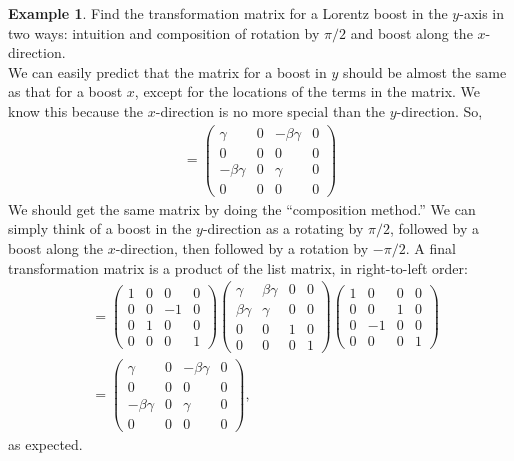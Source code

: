 \documentclass{article}
\theoremstyle{definition}
\newtheorem{exmp}{Example}[section]
\begin{document}
\begin{exmp}
	 Find the transformation matrix for a Lorentz boost in the $y$-axis in two ways: intuition and composition of rotation by $\pi/2$ and boost along the $x$-direction.\\
	 
	 We can easily predict that the matrix for a boost in $y$ should be almost the same as that for a boost $x$, except for the locations of the terms in the matrix. We know this because the $x$-direction is no more special than the $y$-direction. So,
	 \begin{align*}
	 [\Lambda^{\mu'}_\nu] = 
	 \begin{pmatrix}
	 \gamma&0&-\beta\gamma&0\\
	 0&0&0&0\\
	 -\beta\gamma&0&\gamma&0\\
	 0&0&0&0
	 \end{pmatrix}
	 \end{align*}
	 We should get the same matrix by doing the ``composition method.'' We can simply think of a boost in the $y$-direction as a rotating by $\pi/2$, followed by a boost along the $x$-direction, then followed by a rotation by $-\pi/2$. A final transformation matrix is a product of the list matrix, in right-to-left order:
	 \begin{align*}
	 [\Lambda^{\mu'}_\nu] &= 
	 \begin{pmatrix}
	 1 & 0 & 0 & 0 \\
	 0 & 0 & -1 & 0\\
	 0 & 1 & 0 & 0\\
	 0 & 0 & 0 & 1
	 \end{pmatrix}
	 \begin{pmatrix}
	 \gamma & \beta\gamma & 0 & 0\\
	 \beta\gamma & \gamma & 0 & 0\\
	 0 & 0 & 1 & 0\\
	 0 & 0 & 0 & 1
	 \end{pmatrix}
	\begin{pmatrix}
	1 & 0 & 0 & 0\\
	0 & 0 & 1 & 0\\
	0 & -1 & 0 & 0\\
	0 & 0 & 0 & 1
	\end{pmatrix}\\
	&=
	\begin{pmatrix}
	\gamma&0&-\beta\gamma&0\\
	0&0&0&0\\
	-\beta\gamma&0&\gamma&0\\
	0&0&0&0
	\end{pmatrix},
	 \end{align*}
	 as expected.
\end{exmp}
\end{document}
